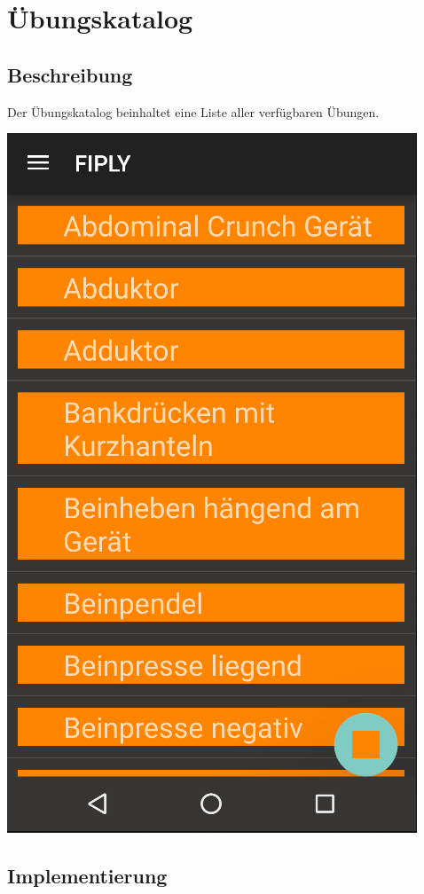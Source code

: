 \documentclass[FIPLY_base.tex]{subfiles}
\author{Gerald Irsiegler}
\date{26. Februar 2016}
\begin{document}
\section{Übungskatalog}

\subsection{Beschreibung}
Der Übungskatalog beinhaltet eine Liste aller verfügbaren Übungen.

\includegraphics[scale=0.4]{img/Uebungskatalog}

\subsection{Implementierung}
\end{document}
